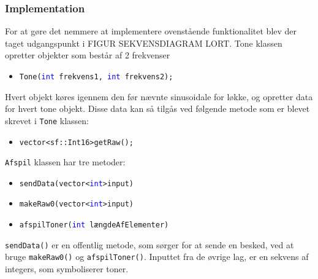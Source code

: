 \subsubsection{Implementation}
For at gøre det nemmere at implementere ovenstående funktionalitet blev der taget udgangspunkt i FIGUR SEKVENSDIAGRAM LORT. 
\newline
Tone klassen opretter objekter som består af 2 frekvenser
\begin{itemize}
	\item \texttt{Tone(\textcolor{blue}{int} frekvens1, \textcolor{blue}{int} frekvens2);}
\end{itemize}
Hvert objekt køres igennem den før nævnte sinusoidale for løkke, og opretter data for hvert tone objekt. Disse data kan så tilgås ved følgende metode som er blevet skrevet i \texttt{Tone} klassen:
\begin{itemize}
	\item \texttt{\textcolor{dkgreen}{vector}<sf::\textcolor{dkgreen}{Int16}>getRaw();}
\end{itemize}
\hfill \break
\texttt{Afspil} klassen har tre metoder:
\begin{itemize}
	\item \texttt{sendData({\textcolor{dkgreen}{vector}}<\textcolor{blue}{int}>input)}
	
	\item \texttt{makeRaw0(\textcolor{dkgreen}{vector}<\textcolor{blue}{int}>input)}
	
	\item \texttt{afspilToner(\textcolor{blue}{int} længdeAfElementer)}
\end{itemize}
\texttt{sendData()} er en offentlig metode, som sørger for at sende en besked, ved at bruge \texttt{makeRaw0()} og \texttt{afspilToner()}. Inputtet fra de øvrige lag, er en sekvens af integers, som symboliserer toner. 
\hfill \break


